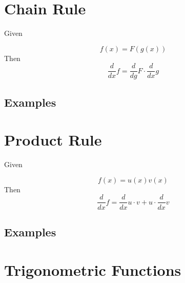 \documentclass[10pt,a4paper]{report}
\begin{document}
\section{Chain Rule}

Given

\begin{equation}
	f(x) = F(g(x))
\end{equation}
Then
\begin{equation}
	\frac{d}{dx} f = \frac{d}{dg} F \cdot \frac{d}{dx} g
\end{equation}

\subsection{Examples}

\section{Product Rule}

Given

\begin{equation}
	f(x) = u(x)v(x)
\end{equation}
Then
\begin{equation}
	\frac{d}{dx} f= \frac{d}{dx} u\cdot v + u \cdot \frac{d}{dx} v
\end{equation}

\subsection{Examples}

\section{Trigonometric Functions}
\end{document}

